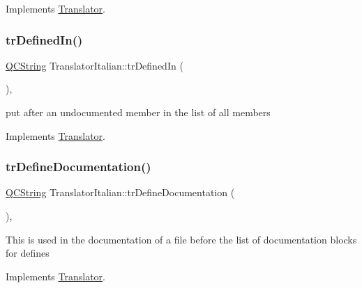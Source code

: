 Implements \mbox{\hyperlink{class_translator}{Translator}}.

\mbox{\label{class_translator_italian_ab93c953a0b074e32fa9e68479255684c}} 
\subsubsection{\texorpdfstring{trDefinedIn()}{trDefinedIn()}}
{\footnotesize\ttfamily \mbox{\hyperlink{class_q_c_string}{Q\+C\+String}} Translator\+Italian\+::tr\+Defined\+In (\begin{DoxyParamCaption}{ }\end{DoxyParamCaption})\hspace{0.3cm}{\ttfamily [inline]}, {\ttfamily [virtual]}}

put after an undocumented member in the list of all members 

Implements \mbox{\hyperlink{class_translator}{Translator}}.

\mbox{\label{class_translator_italian_a467726c14d4b75a1144b97bdf5bb410f}} 
\subsubsection{\texorpdfstring{trDefineDocumentation()}{trDefineDocumentation()}}
{\footnotesize\ttfamily \mbox{\hyperlink{class_q_c_string}{Q\+C\+String}} Translator\+Italian\+::tr\+Define\+Documentation (\begin{DoxyParamCaption}{ }\end{DoxyParamCaption})\hspace{0.3cm}{\ttfamily [inline]}, {\ttfamily [virtual]}}

This is used in the documentation of a file before the list of documentation blocks for defines 

Implements \mbox{\hyperlink{class_translator}{Translator}}.

\mbox{\label{class_translator_italian_a362f3533416351e0a08497f83d936797}} 
